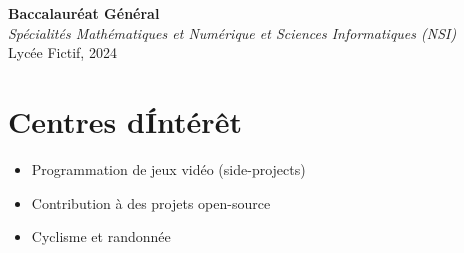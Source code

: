 \documentclass[a4paper,10pt]{article}
\begin{document}
\textbf{Baccalauréat Général} \\
\textit{Spécialités Mathématiques et Numérique et Sciences Informatiques (NSI)} \\
Lycée Fictif, 2024

\section*{Centres d\'Intérêt}
\begin{itemize}
    \item Programmation de jeux vidéo (side-projects)
    \item Contribution à des projets open-source
    \item Cyclisme et randonnée
\end{itemize}
\end{document}
